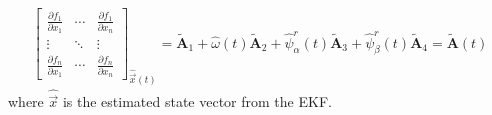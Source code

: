 \documentclass[12pt,a4paper,oneside]{book}
\begin{document}
\begin{onehalfspace}
\begin{mybox}
\begin{equation}
\begin{aligned}
			\begin{bmatrix} \frac{\partial f_1}{\partial x_1} & \cdots & 
				\frac{\partial f_1}{\partial x_n} \\[6pt]
				\vdots & \ddots & \vdots \\[6pt]
				\frac{\partial f_n}{\partial x_1} & \cdots & \frac{\partial 
					f_n}{\partial x_n}
			\end{bmatrix}_{\hat{\vec{x}}(t)} = \tilde{\mathbf{A}}_1 + 
			\hat{\omega}(t) \tilde{\mathbf{A}}_2 + \hat{\psi}_\alpha^r(t) 
			\tilde{\mathbf{A}}_3 + \hat{\psi}_\beta^r(t) \tilde{\mathbf{A}}_4 = 
			\tilde{\mathbf{A}}(t)
		\end{aligned}
	\end{equation} 
	where $\hat{\vec{x}}$ is the estimated state vector from the EKF.
\end{mybox}


\end{onehalfspace}
\end{document}
